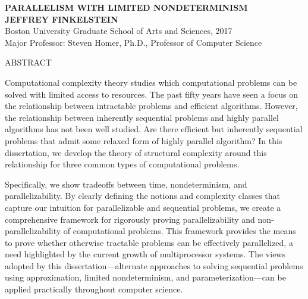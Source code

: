 \newenvironment{abstractpage}
  {\thispagestyle{plain}}
  {}

\begin{abstractpage}
  \begin{center}
    \textbf{\uppercase{Parallelism with limited nondeterminism}} \\
    \textbf{\uppercase{Jeffrey Finkelstein}} \\
    Boston University Graduate School of Arts and Sciences, 2017 \\
    Major Professor: Steven Homer, Ph.D., Professor of Computer Science
  \end{center}
  \begin{center}
    ABSTRACT
  \end{center}
  Computational complexity theory studies which computational problems can be solved with limited access to resources.
  The past fifty years have seen a focus on the relationship between intractable problems and efficient algorithms.
  However, the relationship between inherently sequential problems and highly parallel algorithms has not been well studied.
  Are there efficient but inherently sequential problems that admit some relaxed form of highly parallel algorithm?
  In this dissertation, we develop the theory of structural complexity around this relationship for three common types of computational problems.

  Specifically, we show tradeoffs between time, nondeterminism, and parallelizability.
  By clearly defining the notions and complexity classes that capture our intuition for parallelizable and sequential problems, we create a comprehensive framework for rigorously proving parallelizability and non-parallelizability of computational problems.
  This framework provides the means to prove whether otherwise tractable problems can be effectively parallelized, a need highlighted by the current growth of multiprocessor systems.
  The views adopted by this dissertation---alternate approaches to solving sequential problems using approximation, limited nondeterminism, and parameterization---can be applied practically throughout computer science.
\end{abstractpage}
